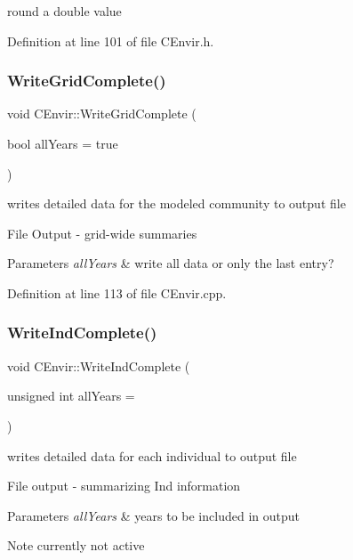 round a double value 

Definition at line 101 of file C\+Envir.\+h.

\mbox{\label{class_c_envir_a627610c9f063c305c7f945ed4dfad005}} 
\subsubsection{\texorpdfstring{WriteGridComplete()}{WriteGridComplete()}}
{\footnotesize\ttfamily void C\+Envir\+::\+Write\+Grid\+Complete (\begin{DoxyParamCaption}\item[{bool}]{all\+Years = {\ttfamily true} }\end{DoxyParamCaption})}



writes detailed data for the modeled community to output file 

File Output -\/ grid-\/wide summaries 
\begin{DoxyParams}{Parameters}
{\em all\+Years} & write all data or only the last entry? \\
\hline
\end{DoxyParams}


Definition at line 113 of file C\+Envir.\+cpp.

\mbox{\label{class_c_envir_ac6a13eb1c2df8737cc912fd7b33aa103}} 
\subsubsection{\texorpdfstring{WriteIndComplete()}{WriteIndComplete()}}
{\footnotesize\ttfamily void C\+Envir\+::\+Write\+Ind\+Complete (\begin{DoxyParamCaption}\item[{unsigned int}]{all\+Years = {} }\end{DoxyParamCaption})}



writes detailed data for each individual to output file 

File output -\/ summarizing Ind information 
\begin{DoxyParams}{Parameters}
{\em all\+Years} & years to be included in output \\
\hline
\end{DoxyParams}
\begin{DoxyNote}{Note}
currently not active 
\end{DoxyNote}


